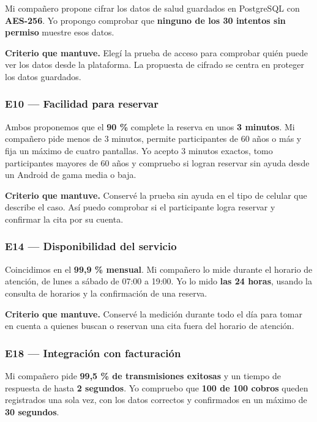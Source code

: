 \documentclass[11pt,a4paper]{article}
\begin{document}
Mi compañero propone cifrar los datos de salud guardados en PostgreSQL con
\textbf{AES-256}. Yo propongo comprobar que \textbf{ninguno de los 30
intentos sin permiso} muestre esos datos.

\textbf{Criterio que mantuve.} Elegí la prueba de acceso para comprobar quién
puede ver los datos desde la plataforma. La propuesta de cifrado se centra en
proteger los datos guardados.

\subsubsection*{E10 --- Facilidad para reservar}

Ambos proponemos que el \textbf{90 \%} complete la reserva en unos \textbf{3
minutos}. Mi compañero pide menos de 3 minutos, permite participantes de 60
años o más y fija un máximo de cuatro pantallas. Yo acepto 3 minutos exactos,
tomo participantes mayores de 60 años y compruebo si logran reservar sin
ayuda desde un Android de gama media o baja.

\textbf{Criterio que mantuve.} Conservé la prueba sin ayuda en el tipo de
celular que describe el caso. Así puedo comprobar si el participante logra
reservar y confirmar la cita por su cuenta.

\subsubsection*{E14 --- Disponibilidad del servicio}

Coincidimos en el \textbf{99,9 \% mensual}. Mi compañero lo mide durante el
horario de atención, de lunes a sábado de 07:00 a 19:00. Yo lo mido
\textbf{las 24 horas}, usando la consulta de horarios y la confirmación de
una reserva.

\textbf{Criterio que mantuve.} Conservé la medición durante todo el día para
tomar en cuenta a quienes buscan o reservan una cita fuera del horario de
atención.

\subsubsection*{E18 --- Integración con facturación}

Mi compañero pide \textbf{99,5 \% de transmisiones exitosas} y un tiempo de
respuesta de hasta \textbf{2 segundos}. Yo compruebo que \textbf{100 de 100
cobros} queden registrados una sola vez, con los datos correctos y
confirmados en un máximo de \textbf{30 segundos}.
\end{document}
